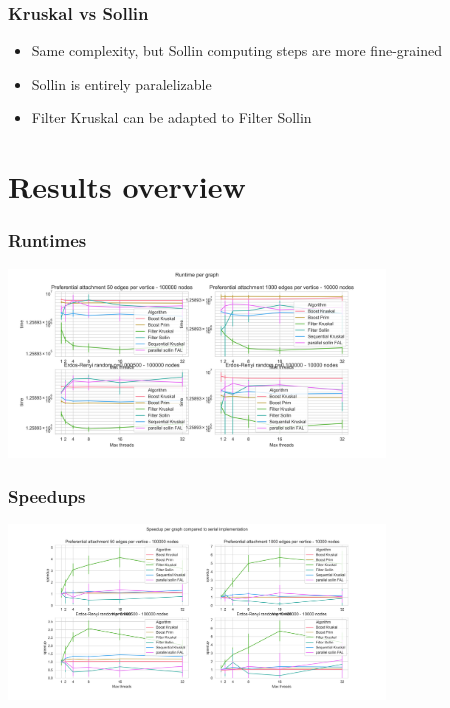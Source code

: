 \documentclass{beamer}
\begin{document}
\begin{frame}
\frametitle{Kruskal vs Sollin}
\begin{itemize}
\item Same complexity, but Sollin computing steps are more fine-grained
\item Sollin is entirely paralelizable
\item Filter Kruskal can be adapted to Filter Sollin
\end{itemize}
\end{frame}


\section{Results overview}

\begin{frame}
\frametitle{Runtimes}
\centering
\includegraphics[width=10cm]{Graph_runtime.png}
\end{frame}

\begin{frame}
\frametitle{Speedups}
\centering
\includegraphics[width=10cm]{Speedup.png}
\end{frame}


\begin{frame}
    \printbibliography
\end{frame} 
\end{document}
